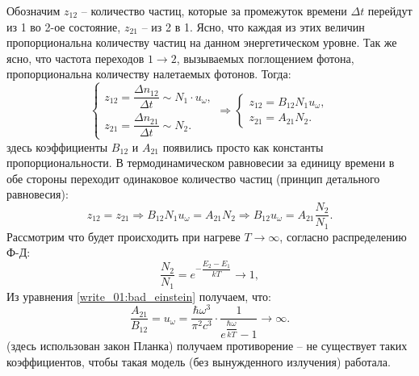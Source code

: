 Обозначим $z_{12}$ -- количество частиц, которые за промежуток времени $\Delta t$ перейдут из 1 во
2-ое состояние, $z_{21}$ -- из 2 в 1. Ясно, что каждая из этих величин пропорциональна количеству
частиц на данном энергетическом уровне. Так же ясно, что частота переходов $1\to 2$, вызываемых
поглощением фотона, пропорциональна количеству налетаемых фотонов. Тогда:
\[
  \begin{cases}
    z_{12} = \dfrac{\Delta n_{12}}{\Delta t} \sim N_1 \cdot u_\omega, \\[10pt]
    z_{21} = \dfrac{\Delta n_{21}}{\Delta t} \sim N_2. 
  \end{cases}
  \Rightarrow
  \begin{cases}
    z_{12} = B_{12} N_1 u_\omega, \\
    z_{21} = A_{21} N_2.
  \end{cases}
\]
здесь коэффициенты $B_{12}$ и $A_{21}$ появились просто как константы пропорциональности.
В термодинамическом равновесии за единицу времени в обе стороны переходит одинаковое количество 
частиц (принцип детального равновесия):
\begin{equation}\label{write_01:bad_einstein}
  z_{12} = z_{21} \Rightarrow
  B_{12} N_1 u_\omega = A_{21} N_2
  \Rightarrow
  B_{12} u_\omega = A_{21} \dfrac{N_2}{N_1}.
\end{equation}
Рассмотрим что будет происходить при нагреве $T \to \infty$, согласно распределению Ф-Д:
\[
  \dfrac{N_2}{N_1} = e^{- \dfrac{E_2-E_1}{kT}} \to 1,
\]
Из уравнения \eqref{write_01:bad_einstein} получаем, что:
\[
  \dfrac{A_{21}}{B_{12}}
  = u_\omega
  = \dfrac{\hbar \omega^3}{\pi^2 c^3} \cdot \dfrac{1}{e^{\dfrac{\hbar \omega}{kT}} - 1} \to \infty.
\]
(здесь использован закон Планка) получаем противорение -- не существует таких коэффициентов, чтобы
такая модель (без вынужденного излучения) работала.

